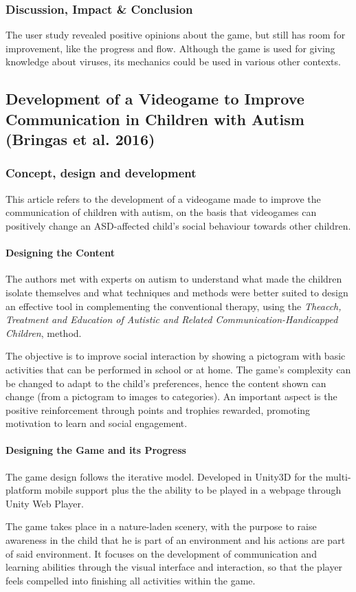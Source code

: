 \documentclass[runningheads]{llncs}
\begin{document}
\subsubsection{Discussion, Impact \& Conclusion}
\par The user study revealed positive opinions about the game, but still has room for improvement, like the progress and flow. Although the game is used for giving knowledge about viruses, its mechanics could be used in various other contexts.




\subsection{Development of a Videogame to Improve Communication in Children with Autism (Bringas et al. 2016)}

\subsubsection{Concept, design and development}
\par This article refers to the development of a videogame made to improve the communication of children with autism, on the basis that videogames can positively change an ASD-affected child's social behaviour towards other children.

\paragraph{Designing the Content} The authors met with experts on autism to understand what made the children isolate themselves and what techniques and methods were better suited to design an effective tool in complementing the conventional therapy, using the \textit{Theacch, Treatment and Education of Autistic and Related Communication-Handicapped Children}, method.
\par The objective is to improve social interaction by showing a pictogram with basic activities that can be performed in school or at home.
The game's complexity can be changed to adapt to the child's preferences, hence the content shown can change (from a pictogram to images to categories). An important aspect is the positive reinforcement through points and trophies rewarded, promoting motivation to learn and social engagement.

\paragraph{Designing the Game and its Progress} The game design follows the iterative model. Developed in Unity3D for the multi-platform mobile support plus the the ability to be played in a webpage through Unity Web Player.
\par The game takes place in a nature-laden scenery, with the purpose to raise awareness in the child that he is part of an environment and his actions are part of said environment. It focuses on the development of communication and learning abilities through the visual interface and interaction, so that the player feels compelled into finishing all activities within the game.
\end{document}
